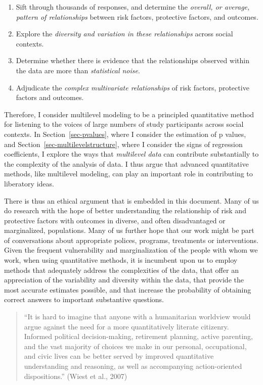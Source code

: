 \documentclass[
  letterpaper,
  DIV=11,
  numbers=noendperiod]{scrreprt}
\providecommand{\tightlist}{%
  \setlength{\itemsep}{0pt}\setlength{\parskip}{0pt}}\usepackage{longtable,booktabs,array}
\begin{document}
\begin{enumerate}
\def\labelenumi{\arabic{enumi}.}
\tightlist
\item
  Sift through thousands of responses, and determine the \emph{overall,
  or average, pattern of relationships} between risk factors, protective
  factors, and outcomes.
\item
  Explore the \emph{diversity and variation in these relationships}
  across social contexts.
\item
  Determine whether there is evidence that the relationships observed
  within the data are more than \emph{statistical noise}.
\item
  Adjudicate the \emph{complex multivariate relationships} of risk
  factors, protective factors and outcomes.
\end{enumerate}

Therefore, I consider multilevel modeling to be a principled
quantitative method for listening to the voices of large numbers of
study participants across social contexts. In Section~\ref{sec-pvalues},
where I consider the estimation of p values, and
Section~\ref{sec-multilevelstructure}, where I consider the signs of
regression coefficients, I explore the ways that \emph{multilevel data}
can contribute substantially to the complexity of the analysis of data.
I thus argue that advanced quantitative methods, like multilevel
modeling, can play an important role in contributing to liberatory
ideas.

There is thus an ethical argument that is embedded in this document.
Many of us do research with the hope of better understanding the
relationship of risk and protective factors with outcomes in diverse,
and often disadvantaged or marginalized, populations. Many of us further
hope that our work might be part of conversations about appropriate
polices, programs, treatments or interventions. Given the frequent
vulnerability and marginalization of the people with whom we work, when
using quantitative methods, it is incumbent upon us to employ methods
that adequately address the complexities of the data, that offer an
appreciation of the variability and diversity within the data, that
provide the most accurate estimates possible, and that increase the
probability of obtaining correct answers to important substantive
questions.

\begin{quote}
``It is hard to imagine that anyone with a humanitarian worldview would
argue against the need for a more quantitatively literate citizenry.
Informed political decision-making, retirement planning, active
parenting, and the vast majority of choices we make in our personal,
occupational, and civic lives can be better served by improved
quantitative understanding and reasoning, as well as accompanying
action-oriented dispositions.'' (Wiest et al., 2007)
\end{quote}
\end{document}
